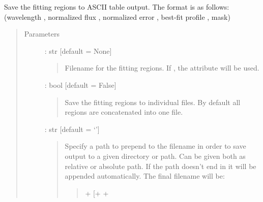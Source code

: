 \documentclass[letterpaper,10pt,english]{sphinxmanual}
\begin{document}
\begin{fulllineitems}
\begin{fulllineitems}
\begin{quote}
\begin{description}
\end{description}\end{quote}

\end{fulllineitems}


\begin{fulllineitems}
\label{\detokenize{api:VoigtFit.DataSet.save_fit_regions}}
Save the fitting regions to ASCII table output.
The format is as follows:
(wavelength , normalized flux , normalized error , best-fit profile , mask)
\begin{quote}\begin{description}
\item[{Parameters}] \leavevmode
{} : str   {[}default = None{]}
\begin{quote}

Filename for the fitting regions.
If , the  attribute will be used.
\end{quote}

 : bool   {[}default = False{]}
\begin{quote}

Save the fitting regions to individual files.
By default all regions are concatenated into one file.
\end{quote}

 : str   {[}default = ‘’{]}
\begin{quote}

Specify a path to prepend to the filename in order to save output to a given
directory or path. Can be given both as relative or absolute path.
If the path doesn’t end in \sphinxtitleref{/} it will be appended automatically.
The final filename will be:
\begin{quote}

 +  {[}+ \sphinxtitleref{\_regN}{]} + 
\end{quote}
\end{quote}

\end{description}\end{quote}

\end{fulllineitems}


\end{fulllineitems}
\end{document}

